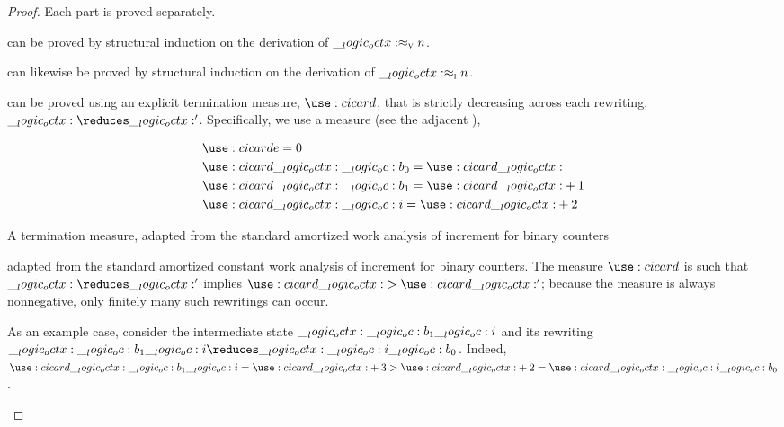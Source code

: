 \begin{proof}
  Each part is proved separately.
  \begin{description}[
    parsep=0pt, listparindent=\parindent,
    labelsep=0.35em
  ]
  \item[Value soundness]
    can be proved by structural induction on the derivation of $\__logic_octx: \approx\sb{\text{\normalfont\scshape v}} n$.
  \item[Preservation and progress]
    can likewise be proved by structural induction on the derivation of $\__logic_octx: \approx\sb{\text{\normalfont\scshape i}} n$.
  \item[Termination]
    can be proved using an explicit termination measure, $\card[i]{}$, that is strictly decreasing across each rewriting, $\octx \reduces \octx'$.
    Specifically, we use a measure (see the adjacent ),
    \begin{marginfigure}
      \begin{equation*}
        \begin{lgathered}
          \card[i]{e} = 0 \\
          \card[i]{\octx \oc b_0} = \card[i]{\octx} \\
          \card[i]{\octx \oc b_1} = \card[i]{\octx} + 1 \\
          \card[i]{\octx \oc i} = \card[i]{\octx} + 2
        \end{lgathered}
      \end{equation*}
      \caption{A termination measure, adapted from the standard amortized work analysis of increment for binary counters}\label{fig:string-rewriting:binary-counter:measure}
    \end{marginfigure}%
    adapted from the standard amortized constant work analysis of increment for binary counters\autocite{Cormen+:MIT09}.
    The measure $\card[i]{}$ is such that $\octx \reduces \octx'$ implies $\card[i]{\octx} > \card[i]{\octx'}$;
    because the measure is always nonnegative, only finitely many such rewritings can occur.

    As an example case, consider the intermediate state $\__logic_octx: \__logic_oc: b_1 \__logic_oc: i$ and its rewriting $\octx \oc b_1 \oc i \reduces \octx \oc i \oc b_0$.
    Indeed, $\card[i]{\octx \oc b_1 \oc i} = \card[i]{\octx} + 3 > \card[i]{\octx} + 2 = \card[i]{\octx \oc i \oc b_0}$.
  \qedhere
  \end{description}
\end{proof}

